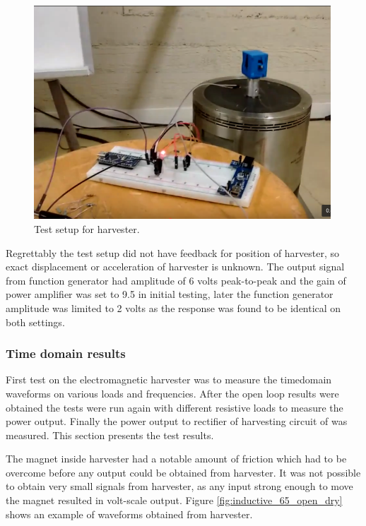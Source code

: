 \begin{figure}[htb]
\begin{center}
\includegraphics[height=8cm]{images/own_pic/shaker_setup/emh_shaker.png}
\end{center}
\caption{\label{fig:emh_shaker} Test setup for harvester.}
\end{figure}

Regrettably the test setup did not have feedback for position of harvester, so exact displacement or acceleration of harvester is unknown. The output signal from function generator had amplitude of 6 volts peak-to-peak and the gain of power amplifier was set to 9.5 in initial testing, later the function generator amplitude was limited to 2 volts as the response was found to be identical on both settings.

\subsubsection{Time domain results}\label{sect:lg_td}
First test on the electromagnetic harvester was to measure the timedomain waveforms on various loads and frequencies. After the open loop results were obtained the tests were run again with different resistive loads to measure the power output. Finally the power output to rectifier of harvesting circuit of was measured. This section presents the test results. 

The magnet inside harvester had a notable amount of friction which had to be overcome before any output could be obtained from harvester. It was not possible to obtain very small signals from harvester, as any input strong enough to move the magnet resulted in volt-scale output. Figure \ref{fig:inductive_65_open_dry} shows an example of waveforms obtained from harvester. 

